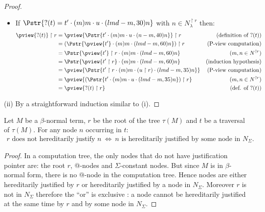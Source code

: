 \begin{proof}
\begin{itemize}
\item If $\Pstr{ ?(t) =  t' \cdot (m){m} \cdot u \cdot (lmd-m,30){n} }$ with $n\in N^{\upharpoonright r}_\lambda$ then:
        \begin{align*}
        \pview{?(t)} \upharpoonright  r
        &= \pview{\Pstr{t' \cdot (m){m} \cdot u \cdot (n-m,40){n}}} \upharpoonright  r
                                                              & (\mbox{definition of } ?(t))\\
        &= (\Pstr{\pview{t'} \cdot (m){m} \cdot  (lmd-m,60){n}}) \upharpoonright  r
                                                              & (\mbox{P-view computation}) \\
        &= \Pstr{ \pview{t'} \upharpoonright  r \cdot (m){m} \cdot  (lmd-m,60){n} }
                                                              & (m, n \in N^{\upharpoonright r}) \\
        &= \Pstr{ \pview{t'\upharpoonright r}  \cdot (m){m} \cdot  (lmd-m,60){n} }
                                                              & \mbox{(induction hypothesis)} \\
        &= \pview{ \Pstr{t' \upharpoonright r \cdot (m){m} \cdot {(u \upharpoonright r)} \cdot (lmd-m,35){n}}}
                                                           & (\mbox{P-view computation}) \\
        &= \pview{ (\Pstr{t' \cdot (m){m} \cdot u \cdot (lmd-m,35){n}}) \upharpoonright r }
                                                           & (m, n \in N^{\upharpoonright r}) \\
        &= \pview{ ?(t) \upharpoonright r }                & \mbox{(def. of $?(t)$)}
        \end{align*}
\end{itemize}
(ii) By a straightforward induction similar to (i).
\end{proof}

\begin{lem}
\label{lem:betaeta_trav}
Let $M$ be a $\beta$-normal term, $r$ be the root of the tree $\tau(M)$ and
$t$ be a traversal of $\tau(M)$.
For any node $n$ occurring in $t$:
\begin{eqnarray*}
r \mbox{ does not hereditarily justify } n  \  \iff \   n \mbox{ is
hereditarily justified by some node in } N_\Sigma.
\end{eqnarray*}
\end{lem}
\begin{proof}
 In a computation tree, the only nodes that do not have justification pointer are:
the root $r$, @-nodes and $\Sigma$-constant nodes. But since $M$ is
in $\beta$-normal form, there is no @-node in the computation tree.
Hence nodes are either hereditarily justified by $r$ or hereditarily
justified by a node in $N_\Sigma$. Moreover $r$ is not in $N_\Sigma$
therefore the ``or'' is exclusive : a node cannot be hereditarily
justified at the same time by $r$ and by some node in $N_\Sigma$.
\end{proof}


